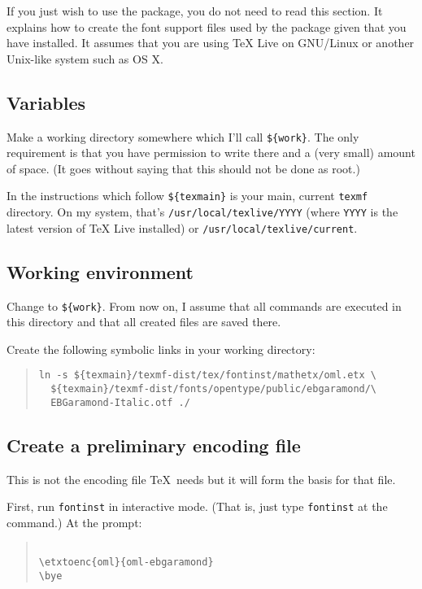 \documentclass[12pt,british,a4paper]{article}
\begin{document}
If you just wish to use the package, you do not need to read this section.
It explains how to create the font support files used by the package given that you have  installed.
It assumes that you are using TeX Live on GNU/Linux or another Unix-like system such as OS X.

\subsection{Variables}\label{subsec:var}
Make a working directory somewhere which I'll call \verb|${work}|.
The only requirement is that you have permission to write there and a (very small) amount of space.
(It goes without saying that this should not be done as root.)

In the instructions which follow \verb|${texmain}| is your main, current \verb|texmf| directory.
On my system, that's \verb|/usr/local/texlive/YYYY| (where \verb|YYYY| is the latest version of TeX Live installed) or \verb|/usr/local/texlive/current|.

\subsection{Working environment}\label{subsec:amgylchedd}

Change to \verb|${work}|.
From now on, I assume that all commands are executed in this directory and that all created files are saved there.

Create the following symbolic links in your working directory:

\begin{quote}
\begin{verbatim}
ln -s ${texmain}/texmf-dist/tex/fontinst/mathetx/oml.etx \
  ${texmain}/texmf-dist/fonts/opentype/public/ebgaramond/\
  EBGaramond-Italic.otf ./
\end{verbatim}
\end{quote}

\subsection{Create a preliminary encoding file}\label{subsec:creu-enc}
This is not the encoding file \TeX\ needs but it will form the basis for that file.

First, run \verb|fontinst| in interactive mode.
(That is, just type \verb|fontinst| at the command.)
At the prompt:
\begin{quote}
\begin{verbatim}

\etxtoenc{oml}{oml-ebgaramond}
\bye
\end{verbatim}
\end{quote}
\end{document}
